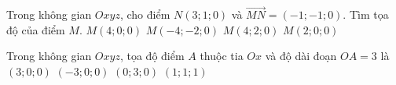 \begin{ex}%
	Trong không gian $Oxyz$, cho điểm $N(3;1;0)$ và $\overrightarrow{MN}=(-1;-1;0)$. Tìm tọa độ của điểm $M$.
	\choice
	{$M(4;0;0)$}
	{$M(-4;-2;0)$}
	{\True $M(4;2;0)$}
	{ $M(2;0;0)$}
\end{ex}
\begin{ex}%
Trong không gian $Oxyz$, tọa độ điểm $ A $ thuộc tia $ Ox $ và độ dài đoạn $ OA=3 $ là
\choice
{\True $ (3;0;0) $}
{ $ (-3;0;0) $}
{ $ (0;3;0) $}
{$ (1;1;1) $}
\end{ex}

